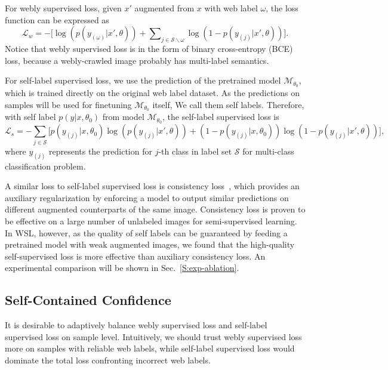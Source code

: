 \documentclass[runningheads]{llncs}
\begin{document}
For webly supervised loss, given $x'$ augmented from $x$ with web label $\omega$, the loss function can be expressed as
\begin{equation}
\label{eq:loss_w}
	\mathcal{L}_w=-\biggl[\log\left(p(y_{(\omega)}|x',\theta)\right)
	+\sum\nolimits_{j\in\mathcal{S}\backslash\omega}\log\left(1-p(y_{(j)}|x',\theta)\right)\biggl].
\end{equation}
Notice that webly supervised loss is in the form of binary cross-entropy (BCE) loss, because a webly-crawled image probably has multi-label semantics.

For self-label supervised loss, we use the prediction of the pretrained model $\mathcal{M}_{\theta_0}$, which is trained directly on the original web label dataset. As the predictions on samples will be used for finetuning $\mathcal{M}_{\theta_0}$ itself, We call them self labels.  Therefore, with self label $p(y|x,\theta_0)$ from model $\mathcal{M}_{\theta_0}$, the self-label supervised loss is 
\begin{equation}
\mathcal{L}_s = -\sum_{j\in\mathcal{S}}
\biggl[p(y_{(j)}|x,\theta_0)\log\left(p(y_{(j)}|x',\theta)\right) 
+ \left(1-p(y_{(j)}|x,\theta_0)\right)\log\left(1-p(y_{(j)}|x',\theta)\right)
\biggl],
\end{equation}
where $y_{(j)}$ represents the prediction for $j$-th class in label set $\mathcal{S}$ for multi-class classification problem.

A similar loss to self-label supervised loss is consistency loss~\cite{berthelot2019mixmatch,xie2019unsupervised}, which provides an auxiliary regularization by enforcing a model to output similar predictions on different augmented counterparts of the same image. Consistency loss is proven to be effective on a large number of unlabeled images for semi-supervised learning. In WSL, however, as the quality of self labels can be guaranteed by feeding a pretrained model with weak augmented images, we found that the high-quality self-supervised loss is more effective than auxiliary consistency loss. An experimental comparison will be shown in Sec.~\ref{S:exp-ablation}.

\subsection{Self-Contained Confidence}
\label{S:method-conf}
It is desirable to adaptively balance webly supervised loss and self-label supervised loss on sample level. Intuitively, we should trust webly supervised loss more on samples with reliable web labels, while self-label supervised loss would dominate the total loss confronting incorrect web labels. 
\end{document}
